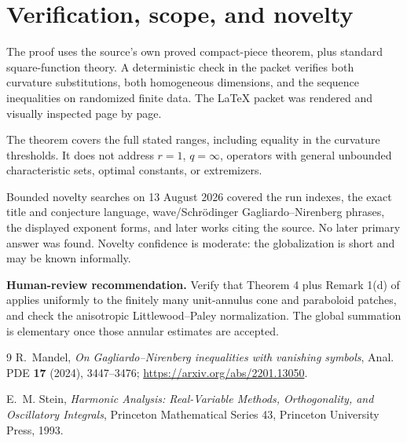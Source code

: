 \documentclass[11pt]{article}
\begin{document}
\section{Verification, scope, and novelty}

The proof uses the source's own proved compact-piece theorem, plus standard
square-function theory.  A deterministic check in the packet verifies both
curvature substitutions, both homogeneous dimensions, and the sequence
inequalities on randomized finite data.  The LaTeX packet was rendered and
visually inspected page by page.

The theorem covers the full stated ranges, including equality in the
curvature thresholds.  It does not address $r=1$, $q=\infty$, operators with
general unbounded characteristic sets, optimal constants, or extremizers.

Bounded novelty searches on 13 August 2026 covered the run indexes, the exact
title and conjecture language, wave/Schr\"odinger Gagliardo--Nirenberg phrases,
the displayed exponent forms, and later works citing the source.  No later
primary answer was found.  Novelty confidence is moderate: the globalization
is short and may be known informally.

\textbf{Human-review recommendation.}  Verify that Theorem 4 plus Remark 1(d)
of \cite{Mandel} applies uniformly to the finitely many unit-annulus cone and
paraboloid patches, and check the anisotropic Littlewood--Paley normalization.
The global summation is elementary once those annular estimates are accepted.

\begin{thebibliography}{9}
R.~Mandel,
\emph{On Gagliardo--Nirenberg inequalities with vanishing symbols},
Anal. PDE \textbf{17} (2024), 3447--3476;
\url{https://arxiv.org/abs/2201.13050}.

E.~M. Stein,
\emph{Harmonic Analysis: Real-Variable Methods, Orthogonality, and
Oscillatory Integrals}, Princeton Mathematical Series 43,
Princeton University Press, 1993.
\end{thebibliography}
\end{document}
